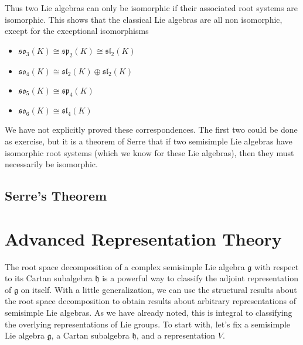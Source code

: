 Thus two Lie algebras can only be isomorphic if their associated root systems are isomorphic. This shows that the classical Lie algebras are all non isomorphic, except for the exceptional isomorphisms
%
\begin{itemize}
    \item $\mathfrak{so}_3(K) \cong \mathfrak{sp}_2(K) \cong \mathfrak{sl}_2(K)$
    \item $\mathfrak{so}_4(K) \cong \mathfrak{sl}_2(K) \oplus \mathfrak{sl}_2(K)$
    \item $\mathfrak{so}_5(K) \cong \mathfrak{sp}_4(K)$
    \item $\mathfrak{so}_6(K) \cong \mathfrak{sl}_4(K)$
\end{itemize}
%
We have not explicitly proved these correspondences. The first two could be done as exercise, but it is a theorem of Serre that if two semisimple Lie algebras have isomorphic root systems (which we know for these Lie algebras), then they must necessarily be isomorphic.

\section{Serre's Theorem}



















\chapter{Advanced Representation Theory}

The root space decomposition of a complex semisimple Lie algebra $\mathfrak{g}$ with respect to its Cartan subalgebra $\mathfrak{h}$ is a powerful way to classify the adjoint representation of $\mathfrak{g}$ on itself. With a little generalization, we can use the structural results about the root space decomposition to obtain results about arbitrary representations of semisimple Lie algebras. As we have already noted, this is integral to classifying the overlying representations of Lie groups. To start with, let's fix a semisimple Lie algebra $\mathfrak{g}$, a Cartan subalgebra $\mathfrak{h}$, and a representation $V$.

